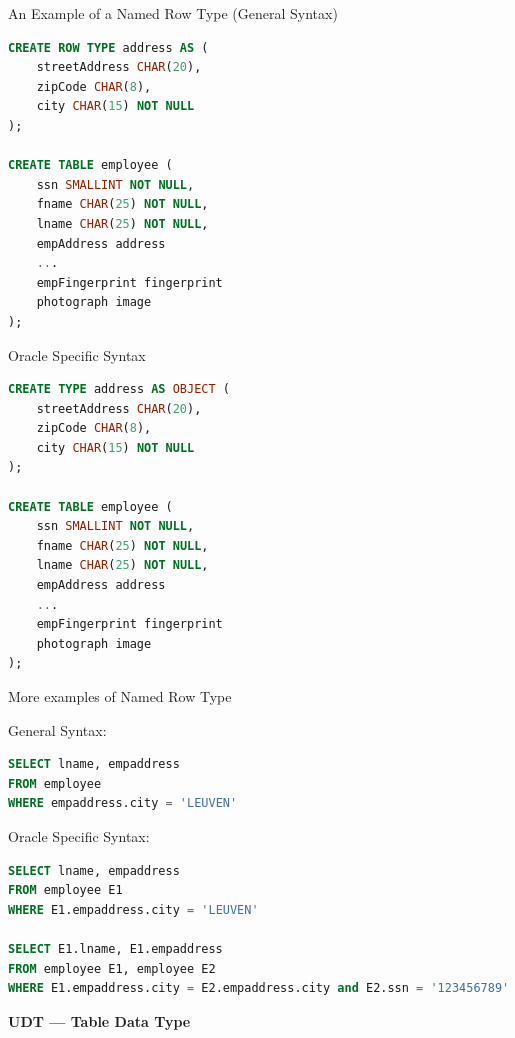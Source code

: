 \documentclass[11pt]{article}
\newcommand{\boldsec}[1]{
    \vspace{11pt}
    \textbf{#1}
    \vspace{11pt}
}
\begin{document}
An Example of a Named Row Type (General Syntax)
\vspace{11pt}
\begin{lstlisting}[language=sql, breaklines=true, showstringspaces=false]
CREATE ROW TYPE address AS (
    streetAddress CHAR(20),
    zipCode CHAR(8),
    city CHAR(15) NOT NULL
);

CREATE TABLE employee (
    ssn SMALLINT NOT NULL,
    fname CHAR(25) NOT NULL,
    lname CHAR(25) NOT NULL,
    empAddress address
    ...
    empFingerprint fingerprint
    photograph image
);
\end{lstlisting}
\vspace{11pt}

Oracle Specific Syntax
\vspace{11pt}
\begin{lstlisting}[language=sql, breaklines=true, showstringspaces=false]
CREATE TYPE address AS OBJECT (
    streetAddress CHAR(20),
    zipCode CHAR(8),
    city CHAR(15) NOT NULL
);

CREATE TABLE employee (
    ssn SMALLINT NOT NULL,
    fname CHAR(25) NOT NULL,
    lname CHAR(25) NOT NULL,
    empAddress address
    ...
    empFingerprint fingerprint
    photograph image
);
\end{lstlisting}
\vspace{11pt}

More examples of Named Row Type

General Syntax:

\vspace{11pt}
\begin{lstlisting}[language=sql, breaklines=true, showstringspaces=false]
SELECT lname, empaddress
FROM employee
WHERE empaddress.city = 'LEUVEN'
\end{lstlisting}
\vspace{11pt}

Oracle Specific Syntax:

\vspace{11pt}
\begin{lstlisting}[language=sql, breaklines=true, showstringspaces=false]
SELECT lname, empaddress
FROM employee E1
WHERE E1.empaddress.city = 'LEUVEN'

SELECT E1.lname, E1.empaddress
FROM employee E1, employee E2
WHERE E1.empaddress.city = E2.empaddress.city and E2.ssn = '123456789'
\end{lstlisting}
\vspace{11pt}

\boldsec{UDT --- Table Data Type}
\end{document}
